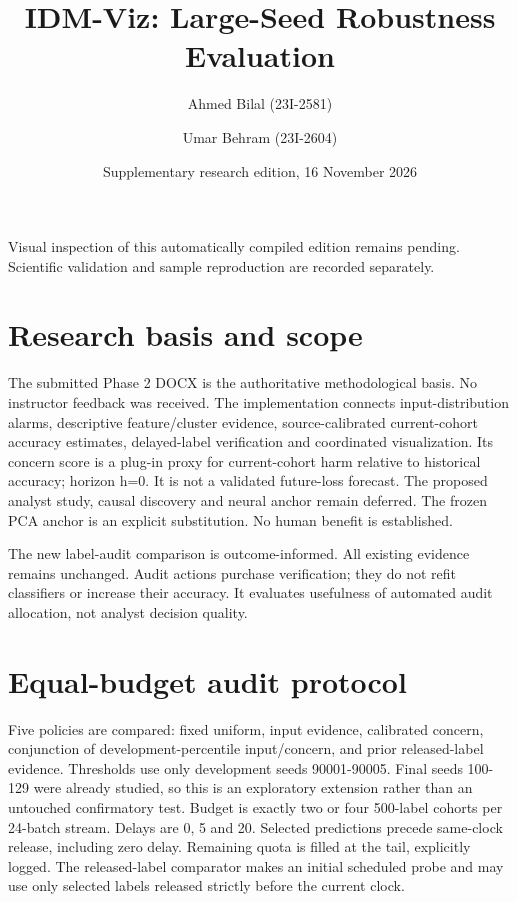\documentclass[11pt,a4paper]{article}
\title{IDM-Viz: Large-Seed Robustness Evaluation}
\author{Ahmed Bilal (23I-2581) \and Umar Behram (23I-2604)}
\date{Supplementary research edition, 16 November 2026}
\begin{document}
\maketitle
\noindent Visual inspection of this automatically compiled edition remains pending. Scientific validation and sample reproduction are recorded separately.\par

\section{Research basis and scope}

The submitted Phase 2 DOCX is the authoritative methodological basis. No instructor feedback was received. The implementation connects input-distribution alarms, descriptive feature/cluster evidence, source-calibrated current-cohort accuracy estimates, delayed-label verification and coordinated visualization. Its concern score is a plug-in proxy for current-cohort harm relative to historical accuracy; horizon h=0. It is not a validated future-loss forecast. The proposed analyst study, causal discovery and neural anchor remain deferred. The frozen PCA anchor is an explicit substitution. No human benefit is established.\par

The new label-audit comparison is outcome-informed. All existing evidence remains unchanged. Audit actions purchase verification; they do not refit classifiers or increase their accuracy. It evaluates usefulness of automated audit allocation, not analyst decision quality.\par

\section{Equal-budget audit protocol}

Five policies are compared: fixed uniform, input evidence, calibrated concern, conjunction of development-percentile input/concern, and prior released-label evidence. Thresholds use only development seeds 90001-90005. Final seeds 100-129 were already studied, so this is an exploratory extension rather than an untouched confirmatory test. Budget is exactly two or four 500-label cohorts per 24-batch stream. Delays are 0, 5 and 20. Selected predictions precede same-clock release, including zero delay. Remaining quota is filled at the tail, explicitly logged. The released-label comparator makes an initial scheduled probe and may use only selected labels released strictly before the current clock.\par
\end{document}
